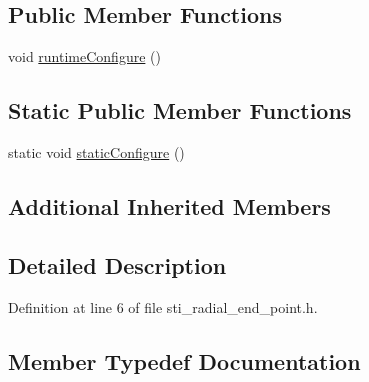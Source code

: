 \subsection*{Public Member Functions}
\begin{DoxyCompactItemize}
\item 
void \hyperlink{structsm__ridgeback__floor__coverage__static__1_1_1radial__motion__states_1_1StiRadialEndPoint_ae8683d10de2cb8d03b79feacd1da7bff}{runtime\+Configure} ()
\end{DoxyCompactItemize}
\subsection*{Static Public Member Functions}
\begin{DoxyCompactItemize}
\item 
static void \hyperlink{structsm__ridgeback__floor__coverage__static__1_1_1radial__motion__states_1_1StiRadialEndPoint_ac535a41eac5a642e76ebabc2a215cd20}{static\+Configure} ()
\end{DoxyCompactItemize}
\subsection*{Additional Inherited Members}


\subsection{Detailed Description}


Definition at line 6 of file sti\+\_\+radial\+\_\+end\+\_\+point.\+h.



\subsection{Member Typedef Documentation}
\mbox{\label{structsm__ridgeback__floor__coverage__static__1_1_1radial__motion__states_1_1StiRadialEndPoint_a112bf52f08cf09de3e8e62847cafe5c8}} 
